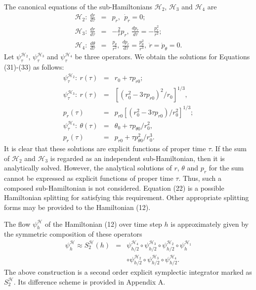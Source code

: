 \documentclass[preprint2]{aastex}
\begin{document}
The canonical equations of the sub-Hamiltonians $\mathcal{H}_2$,
$\mathcal{H}_3$ and $\mathcal{H}_4$ are
\begin{eqnarray}
\mathcal{H}_2: ~ \frac{dr}{d\tau} &=& p_{r}, ~~\dot{p}_{r}=0; \\
\mathcal{H}_3: ~ \frac{dr}{d\tau} &=& -\frac{2}{r}p_r, ~
\frac{d p_r}{d\tau} = -\frac{p^{2}_r}{r^2}; \\
\mathcal{H}_4: ~ \frac{d\theta}{d\tau} &=&
\frac{p_{\theta}}{r^{2}}, ~ \frac{dp_r}{d\tau} =
\frac{p^2_{\theta}}{r^{3}}, ~ \dot{r}=\dot{p}_{\theta}=0.
\end{eqnarray}
Let $\psi^{\mathcal{H}_2}_{\tau}$, $\psi^{\mathcal{H}_3}_{\tau}$
and $\psi^{\mathcal{H}_4}_{\tau}$ be three operators. We obtain
the solutions for Equations (31)-(33) as follows:
\begin{eqnarray}
\psi^{\mathcal{H}_2}_{\tau}: ~r(\tau) &=& r_0+\tau p_{r0}; \\
\psi^{\mathcal{H}_3}_{\tau}: ~ r(\tau) &=& [(r^{2}_{0}-3\tau
p_{r0})^{2}/r_0]^{1/3}, \nonumber \\
 p_r(\tau) &=& p_{r0}[(r^{2}_{0}-3\tau
p_{r0})/r^2_0]^{1/3}; \\
\psi^{\mathcal{H}_4}_{\tau}: ~ \theta(\tau) &=& \theta_0+\tau p_{\theta0}/r^{2}_{0}, \nonumber \\
 p_r(\tau) &=& p_{r0}+\tau p^2_{\theta0}/r^{3}_{0}.
\end{eqnarray}
It is clear that these solutions are explicit functions of proper
time $\tau$. If the sum of $\mathcal{H}_2$ and $\mathcal{H}_3$ is
regarded as an independent sub-Hamiltonian, then it is
analytically solved. However, the analytical solutions of $r$,
$\theta$ and $p_r$ for the sum cannot be expressed as explicit
functions of proper time $\tau$. Thus, such a composed
sub-Hamiltonian is not considered. Equation (22) is a possible
Hamiltonian splitting for satisfying this requirement. Other
appropriate splitting forms may be provided to the Hamiltonian
(12).

The flow  $\psi^{\mathcal{H}}_{h}$ of the Hamiltonian (12) over
time step $h$ is approximately given by the symmetric composition
of these operators
\begin{eqnarray}
\psi^{\mathcal{H}}_{h}\approx S^{\mathcal{H}}_2(h) &=&
\psi^{\mathcal{H}_4}_{h/2}\circ \psi^{\mathcal{H}_3}_{h/2}\circ
\psi^{\mathcal{H}_2}_{h/2}\circ \psi^{\mathcal{H}_1}_{h} \nonumber
\\ & & \circ \psi^{\mathcal{H}_2}_{h/2}\circ \psi^{\mathcal{H}_3}_{h/2}\circ
\psi^{\mathcal{H}_4}_{h/2}.
\end{eqnarray}
The above construction is a second order explicit symplectic
integrator marked as $S^{\mathcal{H}}_2$. Its difference scheme is
provided in Appendix A.
\end{document}
